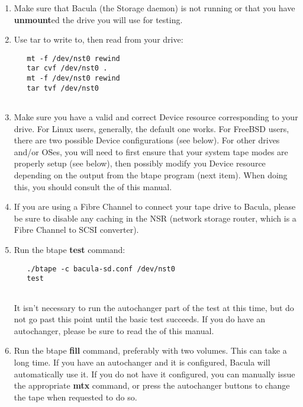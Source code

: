 \begin{enumerate}
\item Make sure that Bacula (the Storage daemon) is not running
  or that you have {\bf unmount}ed the drive you will use 
  for testing.

\item Use tar to write to, then read from your drive:  

   \footnotesize
\begin{verbatim}
   mt -f /dev/nst0 rewind
   tar cvf /dev/nst0 .
   mt -f /dev/nst0 rewind
   tar tvf /dev/nst0
   
\end{verbatim}
\normalsize

\item Make sure you have a valid and correct Device resource corresponding
   to your drive.  For Linux users, generally, the default one works.  For
   FreeBSD users, there are two possible Device configurations (see below).
   For other drives and/or OSes, you will need to first ensure that your
   system tape modes are properly setup (see below), then possibly modify 
   you Device resource depending on the output from the btape program (next
   item). When doing this, you should consult the  of this manual.

\item If you are using a Fibre Channel to connect your tape drive to
   Bacula, please be sure to disable any caching in the NSR (network
   storage router, which is a Fibre Channel to SCSI converter).

\item Run the btape {\bf test} command:  

   \footnotesize
\begin{verbatim}
   ./btape -c bacula-sd.conf /dev/nst0
   test
   
\end{verbatim}
\normalsize

   It isn't necessary to run the autochanger part of the test at this time,
   but do not go past this point until the basic test succeeds.  If you do
   have an autochanger, please be sure to read the  of this manual.

\item Run the btape {\bf fill} command, preferably with two volumes.  This
   can take a long time. If you have an autochanger and it  is configured, Bacula
   will automatically use it. If you do  not have it configured, you can manually
   issue the appropriate  {\bf mtx} command, or press the autochanger buttons to
   change  the tape when requested to do so. 


\end{enumerate}
